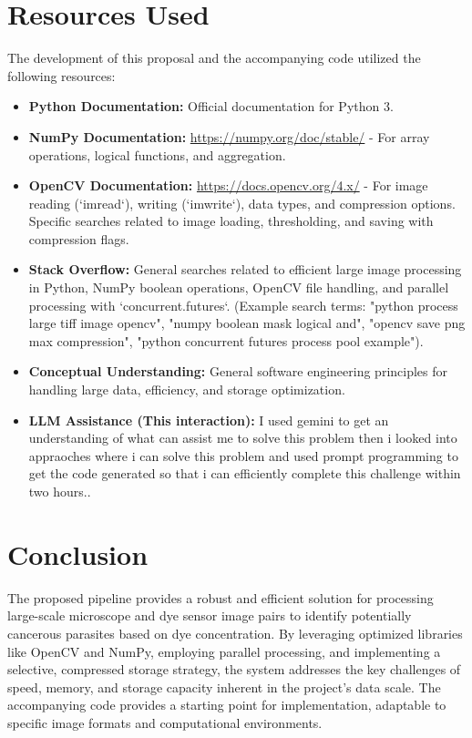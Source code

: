 \documentclass{article}
\begin{document}
\section{Resources Used}
The development of this proposal and the accompanying code utilized the following resources:
\begin{itemize}
    \item \textbf{Python Documentation:} Official documentation for Python 3.
    \item \textbf{NumPy Documentation:} \url{https://numpy.org/doc/stable/} - For array operations, logical functions, and aggregation.
    \item \textbf{OpenCV Documentation:} \url{https://docs.opencv.org/4.x/} - For image reading (`imread`), writing (`imwrite`), data types, and compression options. Specific searches related to image loading, thresholding, and saving with compression flags.
    \item \textbf{Stack Overflow:} General searches related to efficient large image processing in Python, NumPy boolean operations, OpenCV file handling, and parallel processing with `concurrent.futures`. (Example search terms: "python process large tiff image opencv", "numpy boolean mask logical and", "opencv save png max compression", "python concurrent futures process pool example").
    \item \textbf{Conceptual Understanding:} General software engineering principles for handling large data, efficiency, and storage optimization.
    \item \textbf{LLM Assistance (This interaction):} I used gemini to get an understanding of what can assist me to solve this problem then i looked into appraoches where i can solve this problem and used prompt programming to get the code generated so that i can efficiently complete this challenge within two hours..
\end{itemize}

\section{Conclusion}
The proposed pipeline provides a robust and efficient solution for processing large-scale microscope and dye sensor image pairs to identify potentially cancerous parasites based on dye concentration. By leveraging optimized libraries like OpenCV and NumPy, employing parallel processing, and implementing a selective, compressed storage strategy, the system addresses the key challenges of speed, memory, and storage capacity inherent in the project's data scale. The accompanying code provides a starting point for implementation, adaptable to specific image formats and computational environments.
\end{document}
